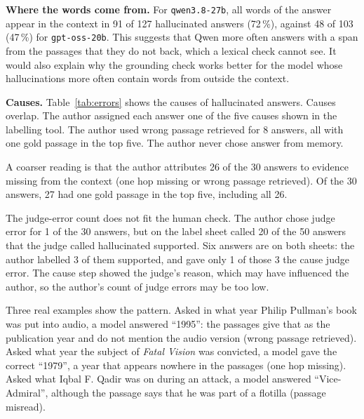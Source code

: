 \begin{table}[htbp]
\centering\small
\caption{Causes of  hallucinated answers from the BM25 and dense conditions, assigned by the
author.}\label{tab:errors}

\end{table}

\textbf{Where the words come from.} For \texttt{qwen3.8-27b}, all words of the answer appear in the context in 91 of 127
hallucinated answers (72\,\%), against 48 of 103 (47\,\%) for \texttt{gpt-oss-20b}. This suggests that Qwen more often
answers with a span from the passages that they do not back, which a lexical check cannot see. It would also explain
why the grounding check works better for the model whose hallucinations more often contain words from outside the
context.

\textbf{Causes.} Table~\ref{tab:errors} shows the causes of  hallucinated answers. Causes overlap. The
author assigned each answer one of the five causes shown in the labelling tool.
The author used wrong passage retrieved for 8 answers, all with one gold passage in the top five. The author never chose answer from memory.

A coarser reading is that the author attributes 26 of the 30
answers to evidence missing from the context (one hop missing or wrong passage retrieved). Of the 30 answers, 27 had one gold passage in the top
five, including all 26.

The judge-error count does not fit the human check. The author chose judge error for 1 of the 30 answers, but on the
label sheet called 20 of the 50 answers that the judge called hallucinated supported. Six answers are on both sheets: the
author labelled 3 of them supported, and gave only 1 of those 3 the cause judge error. The cause step showed the judge's
reason, which may have influenced the author, so the author's count of judge errors may be too low.

Three real examples show the pattern. Asked in what year Philip Pullman's book was put into audio, a model answered
``1995'': the passages give that as the publication year and do not mention the audio version (wrong passage retrieved). Asked
what year the subject of \emph{Fatal Vision} was convicted, a model gave the correct ``1979'', a year that appears nowhere
in the passages (one hop missing). Asked what Iqbal F. Qadir was on during an attack, a model answered ``Vice-Admiral'',
although the passage says that he was part of a flotilla (passage misread).

